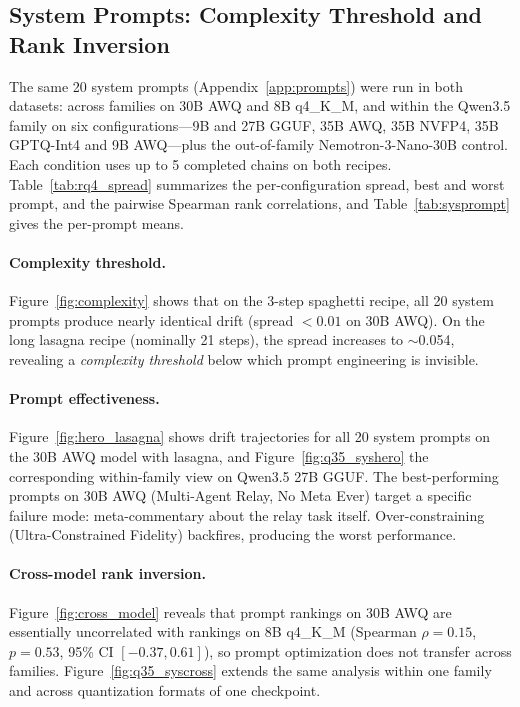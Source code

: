 \documentclass[11pt]{article}
\begin{document}
\clearpage
\subsection{System Prompts: Complexity Threshold and Rank Inversion}
\label{sec:rq3}

The same 20 system prompts (Appendix~\ref{app:prompts}) were run in both
datasets: across families on 30B AWQ and 8B q4\_K\_M, and within the Qwen3.5
family on six configurations---9B and 27B GGUF, 35B AWQ, 35B NVFP4, 35B
GPTQ-Int4 and 9B AWQ---plus the out-of-family Nemotron-3-Nano-30B control.
Each condition uses up to 5 completed chains on both recipes.
Table~\ref{tab:rq4_spread} summarizes the per-configuration spread, best and
worst prompt, and the pairwise Spearman rank correlations, and
Table~\ref{tab:sysprompt} gives the per-prompt means.

\paragraph{Complexity threshold.}
Figure~\ref{fig:complexity} shows that on the 3-step spaghetti recipe, all 20
system prompts produce nearly identical drift (spread $< 0.01$ on 30B AWQ).
On the long lasagna recipe (nominally 21 steps), the spread increases to $\sim$0.054, revealing
a \emph{complexity threshold} below which prompt engineering is invisible.

\paragraph{Prompt effectiveness.}
Figure~\ref{fig:hero_lasagna} shows drift trajectories for all 20 system prompts
on the 30B AWQ model with lasagna, and Figure~\ref{fig:q35_syshero} the
corresponding within-family view on Qwen3.5 27B GGUF. The best-performing
prompts on 30B AWQ (Multi-Agent Relay, No Meta Ever) target a specific failure
mode: meta-commentary about the relay task itself. Over-constraining
(Ultra-Constrained Fidelity) backfires, producing the worst performance.

\paragraph{Cross-model rank inversion.}
Figure~\ref{fig:cross_model} reveals that prompt rankings on 30B AWQ are
essentially uncorrelated with rankings on 8B q4\_K\_M
(Spearman $\rho = 0.15$, $p = 0.53$, 95\% CI $[-0.37, 0.61]$), so prompt
optimization does not transfer across families.
Figure~\ref{fig:q35_syscross} extends the same analysis within one family and
across quantization formats of one checkpoint.
\end{document}

